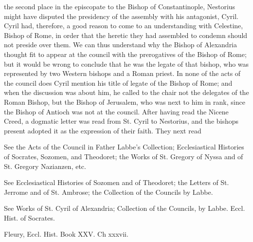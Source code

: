 the second place in the episcopate to the Bishop of Constantinople, Nestorius might have disputed the presidency of the assembly with his antagonist, Cyril. Cyril had, therefore, a good reason to come to an understanding with Celestine, Bishop of Rome, in order that the heretic they had assembled to condemn should not preside over them. We can thus understand why the Bishop of Alexandria thought fit to appear at the council with the prerogatives of the Bishop of Rome; but it would be wrong to conclude that he was the legate of that bishop, who was represented by two Western bishops and a Roman priest. In none of the acts of the council does Cyril mention his title of legate of the Bishop of Rome; and when the discussion was about him, he called to the chair not the delegates of the Roman Bishop, but the Bishop of Jerusalem, who was next to him in rank, since the Bishop of Antioch was not at the council. After having read the Nicene Creed, a dogmatic letter was read from St. Cyril to Nestorius, and the bishops present adopted it as the expression of their faith. They next read

See the Acts of the Council in Father Labbe’s Collection; Ecclesiastical Histories of Socrates, Sozomen, and Theodoret; the Works of St. Gregory of Nyssa and of St. Gregory Nazianzen, etc.

See Ecclesiastical Histories of Sozomen and of Theodoret; the Letters of St. Jerrome and of St. Ambrose; the Collection of the Councils by Labbe.

See Works of St. Cyril of Alexandria; Collection of the Councils, by Labbe. Eccl. Hist. of Socrates.

Fleury, Eccl. Hist. Book XXV. Ch xxxvii.

